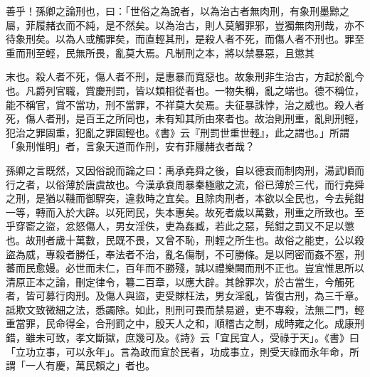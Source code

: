 \begin{pinyinscope}
善乎！孫卿之論刑也，曰：「世俗之為說者，以為治古者無肉刑，有象刑墨黥之屬，菲履赭衣而不純，是不然矣。以為治古，則人莫觸罪邪，豈獨無肉刑哉，亦不待象刑矣。以為人或觸罪矣，而直輕其刑，是殺人者不死，而傷人者不刑也。罪至重而刑至輕，民無所畏，亂莫大焉。凡制刑之本，將以禁暴惡，且懲其

末也。殺人者不死，傷人者不刑，是惠暴而寬惡也。故象刑非生治古，方起於亂今也。凡爵列官職，賞慶刑罰，皆以類相從者也。一物失稱，亂之端也。德不稱位，能不稱官，賞不當功，刑不當罪，不祥莫大矣焉。夫征暴誅悖，治之威也。殺人者死，傷人者刑，是百王之所同也，未有知其所由來者也。故治則刑重，亂則刑輕，犯治之罪固重，犯亂之罪固輕也。《書》云『刑罰世重世輕』，此之謂也。」所謂「象刑惟明」者，言象天道而作刑，安有菲屨赭衣者哉？

孫卿之言既然，又因俗說而論之曰：禹承堯舜之後，自以德衰而制肉刑，湯武順而行之者，以俗薄於唐虞故也。今漢承衰周暴秦極敝之流，俗已薄於三代，而行堯舜之刑，是猶以鞿而御駻突，違救時之宜矣。且除肉刑者，本欲以全民也，今去髡鉗一等，轉而入於大辟。以死罔民，失本惠矣。故死者歲以萬數，刑重之所致也。至乎穿窬之盜，忿怒傷人，男女淫佚，吏為姦臧，若此之惡，髡鉗之罰又不足以懲也。故刑者歲十萬數，民既不畏，又曾不恥，刑輕之所生也。故俗之能吏，公以殺盜為威，專殺者勝任，奉法者不治，亂名傷制，不可勝條。是以罔密而姦不塞，刑蕃而民愈嫚。必世而未仁，百年而不勝殘，誠以禮樂闕而刑不正也。豈宜惟思所以清原正本之論，刪定律令，篹二百章，以應大辟。其餘罪次，於古當生，今觸死者，皆可募行肉刑。及傷人與盜，吏受賕枉法，男女淫亂，皆復古刑，為三千章。詆欺文致微細之法，悉蠲除。如此，則刑可畏而禁易避，吏不專殺，法無二門，輕重當罪，民命得全，合刑罰之中，殷天人之和，順稽古之制，成時雍之化。成康刑錯，雖未可致，孝文斷獄，庶幾可及。《詩》云「宜民宜人，受祿于天」。《書》曰「立功立事，可以永年」。言為政而宜於民者，功成事立，則受天祿而永年命，所謂「一人有慶，萬民賴之」者也。


\end{pinyinscope}